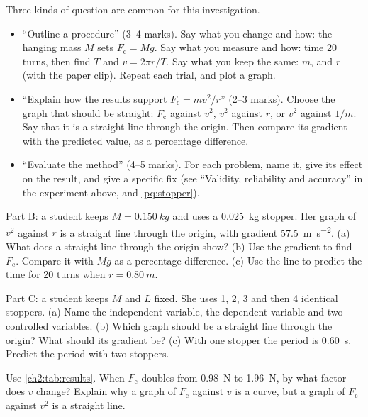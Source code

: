 \begin{examtip}
Three kinds of question are common for this investigation.
\begin{itemize}
  \item ``Outline a procedure'' (3--4 marks). Say what you change and how: the hanging mass
        $M$ sets $F_\mathrm{c} = Mg$. Say what you measure and how: time 20 turns, then find
        $T$ and $v = 2\pi r/T$. Say what you keep the same: $m$, and $r$ (with the
        paper clip). Repeat each trial, and plot a graph.
  \item ``Explain how the results support $F_\mathrm{c} = mv^2/r$'' (2--3 marks).
        Choose the graph that should be straight: $F_\mathrm{c}$ against $v^2$, $v^2$ against
        $r$, or $v^2$ against $1/m$. Say that it is a straight line through the
        origin. Then compare its gradient with the predicted value, as a percentage
        difference.
  \item ``Evaluate the method'' (4--5 marks). For each problem, name it, give its effect on
        the result, and give a specific fix (see ``Validity, reliability and accuracy'' in the
        experiment above, and \cref{pq:stopper}).
\end{itemize}
\end{examtip}

\begin{quickcheck}
  \item Part B: a student keeps $M = \qty{0.150}{kg}$ and uses a \qty{0.025}{kg} stopper. Her
        graph of $v^2$ against $r$ is a straight line through the origin, with gradient
        \qty{57.5}{m.s^{-2}}. (a) What does a straight line through the origin show? (b) Use
        the gradient to find $F_\mathrm{c}$. Compare it with $Mg$ as a percentage difference.
        (c) Use the line to predict the time for 20 turns when $r = \qty{0.80}{m}$.
  \item Part C: a student keeps $M$ and $L$ fixed. She uses 1, 2, 3 and then 4 identical
        stoppers. (a) Name the independent variable, the dependent variable and two
        controlled variables. (b) Which graph should be a straight line through the origin?
        What should its gradient be? (c) With one stopper the period is \qty{0.60}{s}.
        Predict the period with two stoppers.
  \item Use \cref{ch2:tab:results}. When $F_\mathrm{c}$ doubles from \qty{0.98}{N} to
        \qty{1.96}{N}, by what factor does $v$ change? Explain why a graph of $F_\mathrm{c}$
        against $v$ is a curve, but a graph of $F_\mathrm{c}$ against $v^2$ is a straight
        line.
\end{quickcheck}


